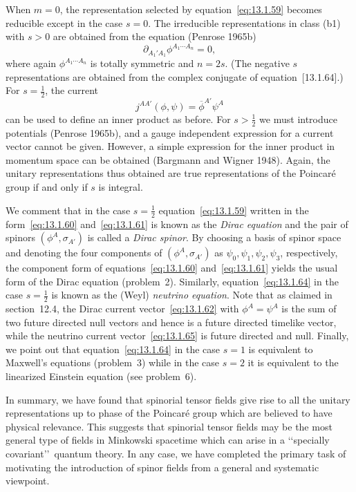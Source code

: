 When \(m=0\), the representation selected by equation~\eqref{eq:13.1.59} becomes
reducible except in the case \(s=0\). The irreducible representations in class (b1)
with \(s>0\) are obtained from the equation (Penrose 1965b)
\begin{equation}
  \partial_{A_1'A_1}\phi^{A_1\cdots A_n}=0,
  \tag{13.1.64}\label{eq:13.1.64}
\end{equation}
where again \(\phi^{A_1\cdots A_n}\) is totally symmetric and \(n=2s\). (The
negative \(s\) representations are obtained from the complex conjugate of
equation~[13.1.64].) For \(s=\tfrac12\), the current
\begin{equation}
  j^{AA'}(\phi,\psi)=\overline\phi^{A'}\psi^A
  \tag{13.1.65}\label{eq:13.1.65}
\end{equation}
can be used to define an inner product as before. For \(s>\tfrac12\) we must
introduce potentials (Penrose 1965b), and a gauge independent expression for a
current vector cannot be given. However, a simple expression for the inner product
in momentum space can be obtained (Bargmann and Wigner 1948). Again, the unitary
representations thus obtained are true representations of the Poincar\'e group if and
only if \(s\) is integral.

We comment that in the case \(s=\tfrac12\) equation~\eqref{eq:13.1.59} written in
the form~\eqref{eq:13.1.60} and~\eqref{eq:13.1.61} is known as the \emph{Dirac
equation} and the pair of spinors \((\phi^A,\sigma_{A'})\) is called a \emph{Dirac
spinor}. By choosing a basis of spinor space and denoting the four components of
\((\phi^A,\sigma_{A'})\) as \(\psi_0,\psi_1,\psi_2,\psi_3\), respectively, the
component form of equations~\eqref{eq:13.1.60} and~\eqref{eq:13.1.61} yields the
usual form of the Dirac equation (problem~2). Similarly,
equation~\eqref{eq:13.1.64} in the case \(s=\tfrac12\) is known as the (Weyl)
\emph{neutrino equation}. Note that as claimed in section~12.4, the Dirac current
vector~\eqref{eq:13.1.62} with \(\phi^A=\psi^A\) is the sum of two future directed
null vectors and hence is a future directed timelike vector, while the neutrino
current vector~\eqref{eq:13.1.65} is future directed and null. Finally, we point
out that equation~\eqref{eq:13.1.64} in the case \(s=1\) is equivalent to Maxwell's
equations (problem~3) while in the case \(s=2\) it is equivalent to the linearized
Einstein equation (see problem~6).

In summary, we have found that spinorial tensor fields give rise to all the unitary
representations up to phase of the Poincar\'e group which are believed to have
physical relevance. This suggests that spinorial tensor fields may be the most
general type of fields in Minkowski spacetime which can arise in a
\lq\lq specially covariant\rq\rq\ quantum theory. In any case, we have completed
the primary task of motivating the introduction of spinor fields from a general and
systematic viewpoint.
